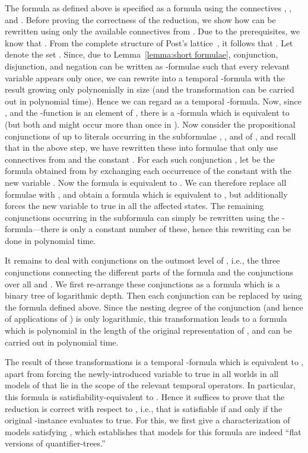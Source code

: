         

        The formula  as defined above is specified as a formula using the connectives \AND, \OR, and \NOT. Before proving the correctness of the reduction, we show how  can be rewritten using only the available connectives from . Due to the prerequisites, we know that . From the complete structure of Post's lattice~\cite{bcrv03}, it follows that . Let  denote the set . Since, due to Lemma~\ref{lemma:short formulae}, conjunction, disjunction, and negation can be written as -formulae such that every relevant variable appears only once, we can rewrite  into a temporal -formula with the result growing only polynomially in size (and the transformation can be carried out in polynomial time). Hence we can regard  as a temporal -formula. Now, since , and the \AND-function is an element of , there is a -formula  which is equivalent to  (but both  and  might occur more than once in ). Now consider the propositional conjunctions of up to  literals occurring in the subformulae , , and  of , and recall that in the above step, we have rewritten these into formulae that only use connectives from  and the constant . For each such conjunction , let  be the formula obtained from  by exchanging each occurrence of the constant  with the new variable . Now the formula  is equivalent to . We can therefore replace all formulae  with , and obtain a formula which is equivalent to , but additionally forces the new variable  to true in all the affected states. The remaining conjunctions occurring in the subformula  can simply be rewritten using the -formula---there is only a constant number of these, hence this rewriting can be done in polynomial time.

        It remains to deal with conjunctions on the outmost level of , i.e., the three conjunctions connecting the different parts of the formula and the conjunctions over all  and . We first re-arrange these conjunctions as a formula which is a binary tree of logarithmic depth. Then each conjunction can be replaced by using the formula  defined above. Since the nesting degree of the conjunction (and hence of applications of ) is only logarithmic, this transformation leads to a formula which is polynomial in the length of the original representation of , and can be carried out in polynomial time.

        The result of these transformations is a temporal -formula which is equivalent to , apart from forcing the newly-introduced variable  to true in all worlds in all models of  that lie in the scope of the relevant temporal operators. In particular, this formula is satisfiability-equivalent to . Hence it suffices to prove that the reduction is correct with respect to , i.e., that  is satisfiable if and only if the original -instance  evaluates to true. For this, we first give a characterization of models satisfying , which establishes that models for this formula are indeed ``flat versions of quantifier-trees.''

